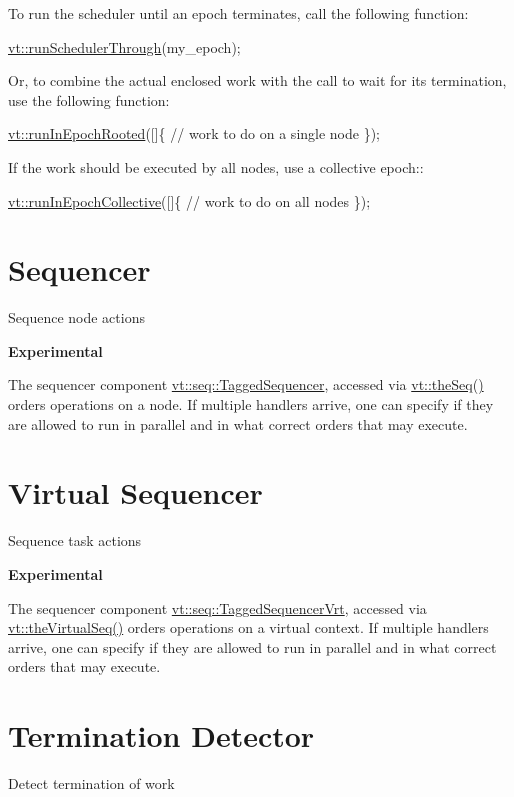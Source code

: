 To run the scheduler until an epoch terminates, call the following function\+:


\begin{DoxyCode}
\hyperlink{namespacevt_aa550774c1c9c668176ce535fd7d58fb0}{vt::runSchedulerThrough}(my\_epoch);
\end{DoxyCode}


Or, to combine the actual enclosed work with the call to wait for its termination, use the following function\+:


\begin{DoxyCode}
\hyperlink{namespacevt_a9f5cbbc484d7f14f2ad0ee46d62dfb6e}{vt::runInEpochRooted}([]\{
  \textcolor{comment}{// work to do on a single node}
\});
\end{DoxyCode}


If the work should be executed by all nodes, use a collective epoch\+:\+:


\begin{DoxyCode}
\hyperlink{namespacevt_a2fc4ef34f30b49a1781d765804bfadbb}{vt::runInEpochCollective}([]\{
  \textcolor{comment}{// work to do on all nodes}
\});
\end{DoxyCode}
 \hypertarget{seq}{}\section{Sequencer}\label{seq}
Sequence node actions

 {\bfseries Experimental}

The sequencer component {\ttfamily \hyperlink{structvt_1_1seq_1_1_tagged_sequencer}{vt\+::seq\+::\+Tagged\+Sequencer}}, accessed via {\ttfamily \hyperlink{namespacevt_a4a7d07c845b311da59286de486d623c7}{vt\+::the\+Seq()}} orders operations on a node. If multiple handlers arrive, one can specify if they are allowed to run in parallel and in what correct orders that may execute. \hypertarget{vrtseq}{}\section{Virtual Sequencer}\label{vrtseq}
Sequence task actions

 {\bfseries Experimental}

The sequencer component {\ttfamily \hyperlink{structvt_1_1seq_1_1_tagged_sequencer_vrt}{vt\+::seq\+::\+Tagged\+Sequencer\+Vrt}}, accessed via {\ttfamily \hyperlink{namespacevt_abdbb9ddb0d79b35c89e9d742d3fc9d42}{vt\+::the\+Virtual\+Seq()}} orders operations on a virtual context. If multiple handlers arrive, one can specify if they are allowed to run in parallel and in what correct orders that may execute. \hypertarget{term}{}\section{Termination Detector}\label{term}
Detect termination of work


